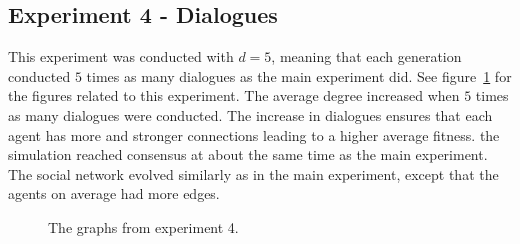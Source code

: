 \subsection{Experiment 4 - Dialogues}
This experiment was conducted with $d = 5$, meaning that each generation conducted $5$ times as many dialogues as the main experiment did. See figure~\ref{fig:Fitness4} for the figures related to this experiment. The average degree increased when $5$ times as many dialogues were conducted. The increase in dialogues ensures that each agent has more and stronger connections leading to a higher average fitness. the simulation reached consensus at about the same time as the main experiment. The social network evolved similarly as in the main experiment, except that the agents on average had more edges.

\begin{figure}[htbp]
    \centering
    \hfill
    \par \bigskip
    \caption{The graphs from experiment 4.}
    \label{fig:Fitness4}
\end{figure}

